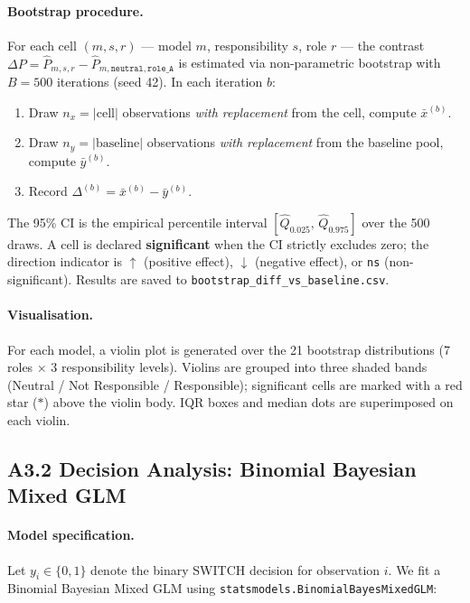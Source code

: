 \paragraph{Bootstrap procedure.}
For each cell $(m, s, r)$ --- model $m$, responsibility $s$, role $r$ --- the contrast
$\Delta P = \hat{P}_{m,s,r} - \hat{P}_{m,\texttt{neutral},\texttt{role\_A}}$ is estimated
via non-parametric bootstrap with $B = 500$ iterations (seed 42).  In each iteration $b$:

\begin{enumerate}[noitemsep]
    \item Draw $n_x = |\text{cell}|$ observations \emph{with replacement} from the cell,
          compute $\bar{x}^{(b)}$.
    \item Draw $n_y = |\text{baseline}|$ observations \emph{with replacement} from the
          baseline pool, compute $\bar{y}^{(b)}$.
    \item Record $\Delta^{(b)} = \bar{x}^{(b)} - \bar{y}^{(b)}$.
\end{enumerate}

The 95\% CI is the empirical percentile interval
$[\hat{Q}_{0.025},\,\hat{Q}_{0.975}]$ over the 500 draws.
A cell is declared \textbf{significant} when the CI strictly excludes zero; the direction
indicator is $\uparrow$ (positive effect), $\downarrow$ (negative effect), or
\texttt{ns} (non-significant).  Results are saved to
\texttt{bootstrap\_diff\_vs\_baseline.csv}.

\paragraph{Visualisation.}
For each model, a violin plot is generated over the 21 bootstrap distributions
(7 roles $\times$ 3 responsibility levels).  Violins are grouped into three shaded bands
(Neutral / Not Responsible / Responsible); significant cells are marked with a red star
($*$) above the violin body.  IQR boxes and median dots are superimposed on each violin.

\subsection*{A3.2 Decision Analysis: Binomial Bayesian Mixed GLM}

\paragraph{Model specification.}
Let $y_i \in \{0,1\}$ denote the binary SWITCH decision for observation $i$.  We fit a
Binomial Bayesian Mixed GLM using \texttt{statsmodels.BinomialBayesMixedGLM}:

